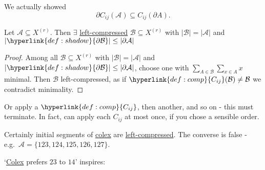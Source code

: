 \documentclass{article}
\let\subset\subseteq
\begin{document}
\begin{remark}
  We actually showed
  \begin{equation*}
    \partial C_{ij}(\mathcal{A}) \subset C_{ij}(\partial A).
  \end{equation*}
\end{remark}
\begin{nprop}\label{prop:5}
  Let $\mathcal{A} \subset X^{(r)}$.
  Then $\exists$ \hyperlink{def:lcomp}{left-compressed} $\mathcal{B} \subset X^{(r)}$ with $|\mathcal{B}| = |\mathcal{A}|$ and $|\hyperlink{def:shadow}{\partial \mathcal{B}}| \leq |\partial \mathcal{A}|$
\end{nprop}
\begin{proof}
  Among all $\mathcal{B} \subset X^{(r)}$ with $|\mathcal{B}| = |\mathcal{A}|$ and $|\hyperlink{def:shadow}{\partial \mathcal{B}}| \leq |\partial \mathcal{A}|$,
  choose one with $\sum_{A \in \mathcal{B}} \sum_{x \in A} x$ minimal.
  Then $\mathcal{B}$ left-compressed, as if $\hyperlink{def:comp}{C_{ij}}(\mathcal{B}) \neq \mathcal{B}$ we contradict minimality.
\end{proof}
\begin{remark}
  Or apply a $\hyperlink{def:comp}{C_{ij}}$, then another, and so on - this must terminate.
  In fact, can apply each $C_{ij}$ at most once, if you chose a sensible order.
\end{remark}

Certainly initial segments of \hyperlink{def:colex}{colex} are \hyperlink{def:lcomp}{left-compressed}.
The converse is false - e.g.\ $\mathcal{A} = \{123,124,125,126,127\}$.

`\hyperlink{def:colex}{Colex} prefers $23$ to $14$' inspires:
\end{document}
